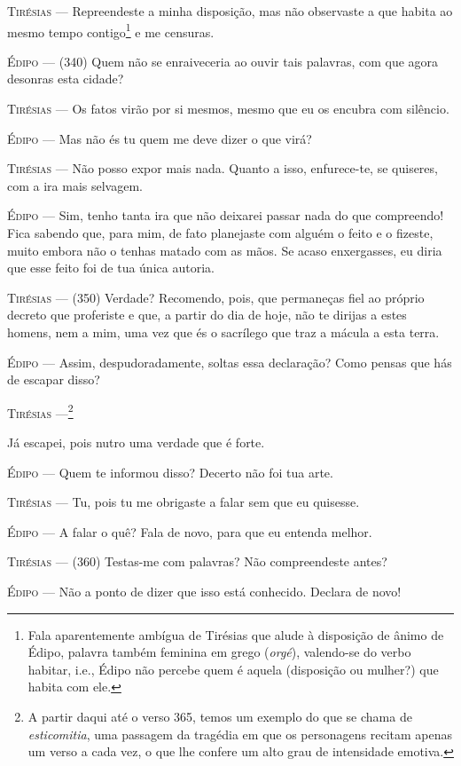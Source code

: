 \textsc{Tirésias} --- Repreendeste a minha disposição, mas não observaste a que habita ao
mesmo tempo contigo\footnote{Fala aparentemente ambígua de Tirésias que
  alude à disposição de ânimo de Édipo, palavra também feminina em grego
  (\emph{orgé}), valendo-se do verbo habitar, i.e., Édipo não percebe
  quem é aquela (disposição ou mulher?) que habita com ele.} e me
censuras.

\textsc{Édipo} --- (340) Quem não se enraiveceria ao ouvir tais palavras, com que agora
desonras esta cidade?

\textsc{Tirésias} --- Os fatos virão por si mesmos, mesmo que eu os encubra com silêncio.

\textsc{Édipo} --- Mas não és tu quem me deve dizer o que virá?

\textsc{Tirésias} --- Não posso expor mais nada. Quanto a isso, enfurece-te, se quiseres, com
a ira mais selvagem.

\textsc{Édipo} --- Sim, tenho tanta ira que não deixarei passar nada do que compreendo!
Fica sabendo que, para mim, de fato planejaste com alguém o feito e o
fizeste, muito embora não o tenhas matado com as mãos. Se acaso
enxergasses, eu diria que esse feito foi de tua única autoria.

\textsc{Tirésias} --- (350) Verdade? Recomendo, pois, que permaneças fiel ao próprio decreto
que proferiste e que, a partir do dia de hoje, não te dirijas a estes
homens, nem a mim, uma vez que és o sacrílego que traz a mácula a esta
terra.

\textsc{Édipo} --- Assim, despudoradamente, soltas essa declaração? Como pensas que hás de
escapar disso?

\textsc{Tirésias} ---\footnote{A partir daqui até o verso 365, temos um
  exemplo do que se chama de \emph{esticomitia}, uma passagem da
  tragédia em que os personagens recitam apenas um verso a cada vez, o
  que lhe confere um alto grau de intensidade emotiva.}

Já escapei, pois nutro uma verdade que é forte.

\textsc{Édipo} --- Quem te informou disso? Decerto não foi tua arte.

\textsc{Tirésias} --- Tu, pois tu me obrigaste a falar sem que eu quisesse.

\textsc{Édipo} --- A falar o quê? Fala de novo, para que eu entenda melhor.

\textsc{Tirésias} --- (360) Testas-me com palavras? Não compreendeste antes?

\textsc{Édipo} --- Não a ponto de dizer que isso está conhecido. Declara de novo!

